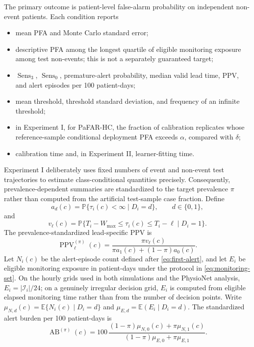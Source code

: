 \documentclass[11pt]{article}
\newcommand{\Pp}{\mathbb{P}}
\newcommand{\Ee}{\mathbb{E}}
\newcommand{\calI}{\mathcal{I}}
\newcommand{\Sens}{\operatorname{Sens}}
\begin{document}
The primary outcome is patient-level false-alarm probability on independent non-event patients. Each condition reports
\begin{itemize}
    \item mean PFA and Monte Carlo standard error;
    \item descriptive PFA among the longest quartile of eligible monitoring exposure among test non-events; this is not a separately guaranteed target;
    \item $\Sens_3$, $\Sens_0$, premature-alert probability, median valid lead time, PPV, and alert episodes per 100 patient-days;
    \item mean threshold, threshold standard deviation, and frequency of an infinite threshold;
    \item in Experiment I, for PaFAR-HC, the fraction of calibration replicates whose reference-sample conditional deployment PFA exceeds $\alpha$, compared with $\delta$;
    \item calibration time and, in Experiment II, learner-fitting time.
\end{itemize}
Experiment I deliberately uses fixed numbers of event and non-event test trajectories to estimate class-conditional quantities precisely. Consequently, prevalence-dependent summaries are standardized to the target prevalence $\pi$ rather than computed from the artificial test-sample case fraction. Define
\[
a_d(c)=\Pp\{\tau_i(c)<\infty\mid D_i=d\},\qquad d\in\{0,1\},
\]
and
\[
v_{\ell}(c)=\Pp\{T_i-W_{\max}\le\tau_i(c)\le T_i-\ell\mid D_i=1\}.
\]
The prevalence-standardized lead-specific PPV is
\begin{equation}
\operatorname{PPV}^{(\pi)}_{\ell}(c)=
\frac{\pi v_{\ell}(c)}
{\pi a_1(c)+(1-\pi)a_0(c)}.
\label{eq:standardized-ppv}
\end{equation}
Let $N_i(c)$ be the alert-episode count defined after \eqref{eq:first-alert}, and let $E_i$ be eligible monitoring exposure in patient-days under the protocol in \eqref{eq:monitoring-set}. On the hourly grids used in both simulations and the PhysioNet analysis, $E_i=|\calI_i|/24$; on a genuinely irregular decision grid, $E_i$ is computed from eligible elapsed monitoring time rather than from the number of decision points. Write $\mu_{N,d}(c)=\Ee\{N_i(c)\mid D_i=d\}$ and $\mu_{E,d}=\Ee(E_i\mid D_i=d)$. The standardized alert burden per 100 patient-days is
\begin{equation}
\operatorname{AB}^{(\pi)}(c)=
100\,
\frac{(1-\pi)\mu_{N,0}(c)+\pi\mu_{N,1}(c)}
{(1-\pi)\mu_{E,0}+\pi\mu_{E,1}}.
\label{eq:standardized-alert-burden}
\end{equation}
\end{document}
